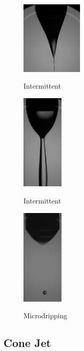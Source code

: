 \begin{multicols}{3}

  \begin{figure}[H]
      \center
      \includegraphics[width=3cm]{Figuras/19:03/intermittent_example.png}
      \label{fig:intermittent_example}
      \caption{Intermittent}
  \end{figure}


  \begin{figure}[H]
      \center
      \includegraphics[width=2cm]{Figuras/19:03/intermittent2_example.png}
      \label{fig:intermittent2_example}
      \caption{Intermittent}
  \end{figure}


  \begin{figure}[H]
      \center
      \includegraphics[width=2cm]{Figuras/19:03/microdripping_example.png}
      \label{fig:microdripping_example}
      \caption{Microdripping}
  \end{figure}

\end{multicols}

\subsection{Cone Jet}
\label{subsec:Cone Jet}



